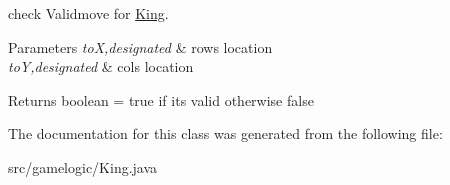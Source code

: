 check Validmove for \mbox{\hyperlink{classgamelogic_1_1_king}{King}}. 
\begin{DoxyParams}{Parameters}
{\em toX,designated} & row\textquotesingle{}s location \\
\hline
{\em toY,designated} & col\textquotesingle{}s location \\
\hline
\end{DoxyParams}
\begin{DoxyReturn}{Returns}
boolean = true if it\textquotesingle{}s valid otherwise false 
\end{DoxyReturn}


The documentation for this class was generated from the following file\+:\begin{DoxyCompactItemize}
\item 
src/gamelogic/King.\+java\end{DoxyCompactItemize}

